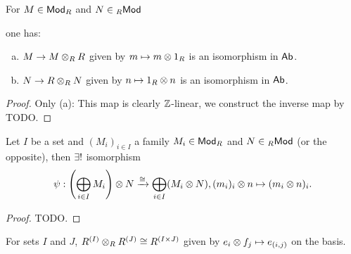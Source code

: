 \documentclass[a4paper]{report}
\begin{document}
\begin{prop}
For $M \in \mathsf{Mod}_R$ and $N \in {}_R\mathsf{Mod}$
\end{prop} one has:
\begin{enumerate}[(a)]
  \item $M \to M \otimes_{R} R$ given by $m \mapsto m \otimes 1_{R}$ is an isomorphism in $\mathsf{Ab}$.
  \item $N \to R \otimes_{R} N$ given by $n \mapsto 1_{R} \otimes n$ is an isomorphism in $\mathsf{Ab}$.
\end{enumerate}
\begin{proof}
Only (a): This map is clearly $\mathbb{Z}$-linear, we construct the inverse map by TODO.
\end{proof}
\begin{prop}
  Let $I$ be a set and $(M_{i})_{i \in I}$ a family $M_{i} \in \mathsf{Mod}_R$ and $N \in {}_R\mathsf{Mod}$ (or the opposite), then $\exists !$ isomorphism \[\psi: \left(\bigoplus_{i \in I} M_{i}\right) \otimes N \xrightarrow \cong \bigoplus_{i \in I} (M_{i} \otimes N), (m_{i})_{i} \otimes n \mapsto (m_{i} \otimes n)_{i}.\]
  \begin{proof}TODO.

  \end{proof}
\end{prop}


\begin{cor}
For sets $I$ and $J$, $R^{(I)} \otimes_{R} R^{(J)} \cong R^{(I \times J)}$ given by $e_{i} \otimes f_{j} \mapsto e_{(i,j)}$ on the basis.
\end{cor}
\end{document}
